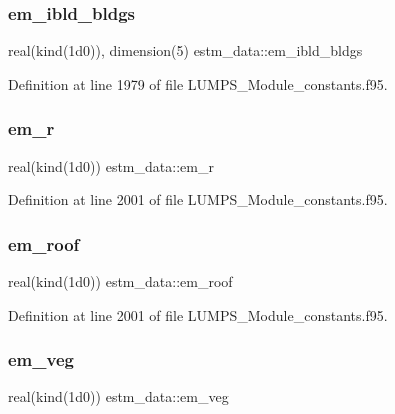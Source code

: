\subsubsection{\texorpdfstring{em\+\_\+ibld\+\_\+bldgs}{em\_ibld\_bldgs}}
{\footnotesize\ttfamily real(kind(1d0)), dimension(5) estm\+\_\+data\+::em\+\_\+ibld\+\_\+bldgs}



Definition at line 1979 of file L\+U\+M\+P\+S\+\_\+\+Module\+\_\+constants.\+f95.

\mbox{\label{namespaceestm__data_a05f990dc7554e916312b7c01b774956f}} 
\subsubsection{\texorpdfstring{em\+\_\+r}{em\_r}}
{\footnotesize\ttfamily real(kind(1d0)) estm\+\_\+data\+::em\+\_\+r}



Definition at line 2001 of file L\+U\+M\+P\+S\+\_\+\+Module\+\_\+constants.\+f95.

\mbox{\label{namespaceestm__data_ae1356a347d79ce36f41977294741499c}} 
\subsubsection{\texorpdfstring{em\+\_\+roof}{em\_roof}}
{\footnotesize\ttfamily real(kind(1d0)) estm\+\_\+data\+::em\+\_\+roof}



Definition at line 2001 of file L\+U\+M\+P\+S\+\_\+\+Module\+\_\+constants.\+f95.

\mbox{\label{namespaceestm__data_acea6bbd39e93113560e4a49945a8aac8}} 
\subsubsection{\texorpdfstring{em\+\_\+veg}{em\_veg}}
{\footnotesize\ttfamily real(kind(1d0)) estm\+\_\+data\+::em\+\_\+veg}



